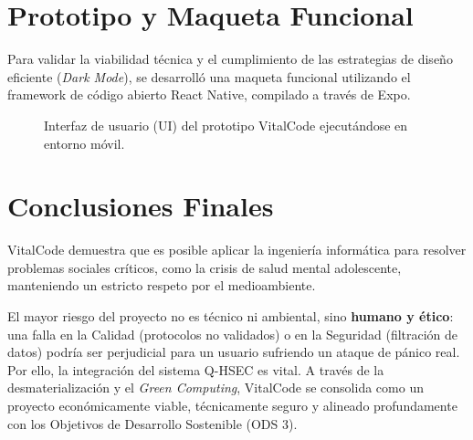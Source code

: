 \documentclass[12pt,letterpaper]{article}
\begin{document}
\section{Prototipo y Maqueta Funcional}
Para validar la viabilidad técnica y el cumplimiento de las estrategias de diseño eficiente (\textit{Dark Mode}), se desarrolló una maqueta funcional utilizando el framework de código abierto React Native, compilado a través de Expo. 

\begin{figure}[H]
\centering
\fbox{\rule{0pt}{2in} \rule{0.9\linewidth}{0pt}}
\caption{Interfaz de usuario (UI) del prototipo VitalCode ejecutándose en entorno móvil.}
\end{figure}

\section{Conclusiones Finales}

VitalCode demuestra que es posible aplicar la ingeniería informática para resolver problemas sociales críticos, como la crisis de salud mental adolescente, manteniendo un estricto respeto por el medioambiente. 

El mayor riesgo del proyecto no es técnico ni ambiental, sino \textbf{humano y ético}: una falla en la Calidad (protocolos no validados) o en la Seguridad (filtración de datos) podría ser perjudicial para un usuario sufriendo un ataque de pánico real. Por ello, la integración del sistema Q-HSEC es vital. A través de la desmaterialización y el \textit{Green Computing}, VitalCode se consolida como un proyecto económicamente viable, técnicamente seguro y alineado profundamente con los Objetivos de Desarrollo Sostenible (ODS 3).
\end{document}
